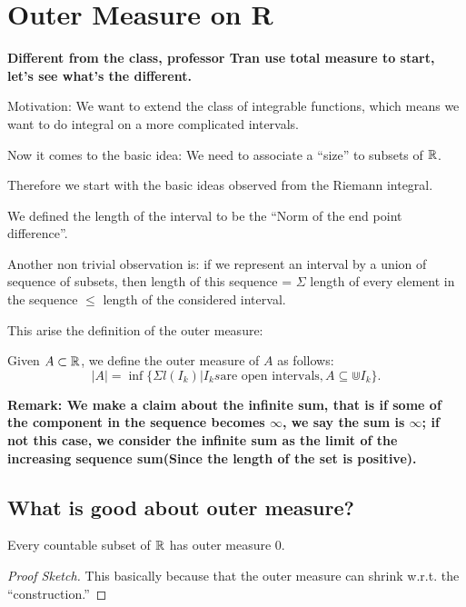 \documentclass[11pt]{article}
\begin{document}
\section{Outer Measure on R}
\label{sec:org48c4386}
\textbf{Different from the class, professor Tran use total measure to start, let's see what's the different.}

Motivation: We want to extend the class of integrable functions, which means we want to do integral on a more complicated intervals.

Now it comes to the basic idea: We need to associate a ``size'' to subsets of \(\mathbb{R}\).

Therefore we start with the basic ideas observed from the Riemann integral.

\begin{definition}
We defined the length of the interval to be the ``Norm of the end point difference''.
\end{definition}

Another non trivial observation is: if we represent an interval by a union of sequence of subsets, then length of this sequence = \(\Sigma\) length of every element in the sequence \(\leq\) length of the considered interval.

This arise the definition of the outer measure:

\begin{definition}
Given \(A \subset \mathbb{R}\), we define the outer measure of \(A\) as follows:
\[
\vert A \vert = \inf \{\Sigma l(I_k) \vert I_ks \text{are open intervals}, A\subseteq \Cup I_k\}.
\]
\end{definition}

\textbf{Remark: We make a claim about the infinite sum, that is if some of the component in the sequence becomes \(\infty\), we say the sum is \(\infty\); if not this case, we consider the infinite sum as the limit of the increasing sequence sum(Since the length of the set is positive).}
\subsection{What is good about outer measure?}
\label{sec:org250af30}
\begin{proposition}[ ]
Every countable subset of \(\mathbb{R}\) has outer measure 0.
\end{proposition}

\begin{proof}[Proof Sketch]
\leavevmode

This basically because that the outer measure can shrink w.r.t. the ``construction.''
\end{proof}
\end{document}

